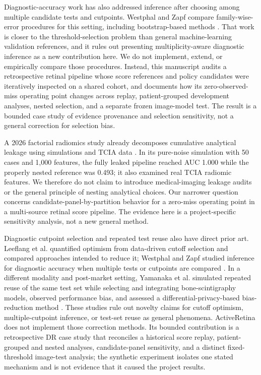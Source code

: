 \documentclass{ieeeaccess}
\begin{document}
Diagnostic-accuracy work has also addressed inference after choosing among multiple candidate tests and cutpoints. Westphal and Zapf compare family-wise-error procedures for this setting, including bootstrap-based methods \cite{westphal2024}. That work is closer to the threshold-selection problem than general machine-learning validation references, and it rules out presenting multiplicity-aware diagnostic inference as a new contribution here. We do not implement, extend, or empirically compare those procedures. Instead, this manuscript audits a retrospective retinal pipeline whose score references and policy candidates were iteratively inspected on a shared cohort, and documents how its zero-observed-miss operating point changes across replay, patient-grouped development analyses, nested selection, and a separate frozen image-model test. The result is a bounded case study of evidence provenance and selection sensitivity, not a general correction for selection bias.

A 2026 factorial radiomics study already decomposes cumulative analytical leakage using simulations and TCIA data \cite{garciahidalgo2026}. In its pure-noise simulation with 50 cases and 1,000 features, the fully leaked pipeline reached AUC 1.000 while the properly nested reference was 0.493; it also examined real TCIA radiomic features. We therefore do not claim to introduce medical-imaging leakage audits or the general principle of nesting analytical choices. Our narrower question concerns candidate-panel-by-partition behavior for a zero-miss operating point in a multi-source retinal score pipeline. The evidence here is a project-specific sensitivity analysis, not a new general method.

Diagnostic cutpoint selection and repeated test reuse also have direct prior art. Leeflang et al. quantified optimism from data-driven cutoff selection and compared approaches intended to reduce it; Westphal and Zapf studied inference for diagnostic accuracy when multiple tests or cutpoints are compared \cite{leeflang2008,westphal2024}. In a different modality and post-market setting, Yamanaka et al. simulated repeated reuse of the same test set while selecting and integrating bone-scintigraphy models, observed performance bias, and assessed a differential-privacy-based bias-reduction method \cite{yamanaka2026}. These studies rule out novelty claims for cutoff optimism, multiple-cutpoint inference, or test-set reuse as general phenomena. ActiveRetina does not implement those correction methods. Its bounded contribution is a retrospective DR case study that reconciles a historical score replay, patient-grouped and nested analyses, candidate-panel sensitivity, and a distinct fixed-threshold image-test analysis; the synthetic experiment isolates one stated mechanism and is not evidence that it caused the project results.
\end{document}
